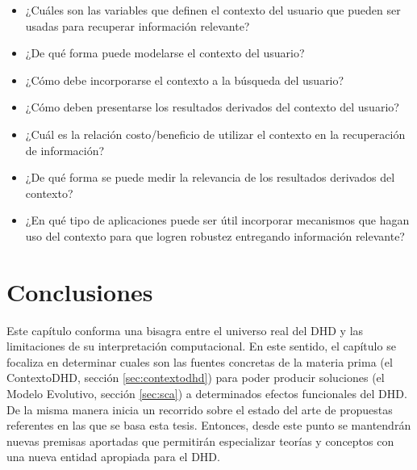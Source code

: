 \begin{itemize}
\item ¿Cuáles son las variables que definen el contexto del usuario que pueden
ser usadas para recuperar información relevante?
\item ¿De qué forma puede modelarse el contexto del usuario?
\item ¿Cómo debe incorporarse el contexto a la búsqueda del usuario?
\item ¿Cómo deben presentarse los resultados derivados del contexto del usuario?
\item ¿Cuál es la relación costo/beneficio de utilizar el contexto en la
recuperación de información?
\item ¿De qué forma se puede medir la relevancia de los resultados derivados del
contexto?
\item ¿En qué tipo de aplicaciones puede ser útil incorporar mecanismos que
hagan uso del contexto para que logren robustez entregando información
relevante?
\end{itemize}


\section{Conclusiones}

Este capítulo conforma una bisagra entre el universo real del DHD y
las limitaciones de su interpretación computacional. En este sentido, el
capítulo se focaliza en determinar cuales son las fuentes concretas de la
materia prima (el ContextoDHD, sección \ref{sec:contextodhd}) para poder
producir soluciones (el Modelo Evolutivo, sección \ref{sec:sca})
a determinados efectos funcionales del DHD. De la misma manera inicia un
recorrido sobre el estado del arte de propuestas referentes en las que se basa
esta tesis. Entonces, desde este punto se mantendrán nuevas premisas aportadas
que permitirán especializar teorías y conceptos con una nueva entidad
apropiada para el DHD.
